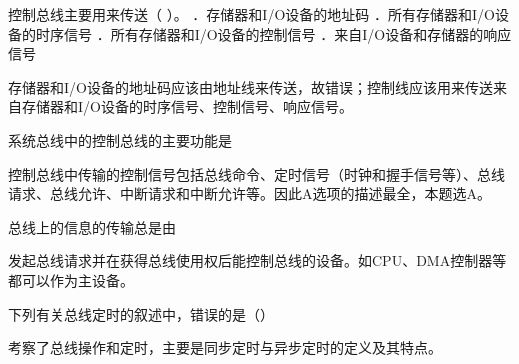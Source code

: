 \question 控制总线主要用来传送（ ）。 ．存储器和I/O设备的地址码
．所有存储器和I/O设备的时序信号 ．所有存储器和I/O设备的控制信号
．来自I/O设备和存储器的响应信号
\par{}
\begin{solution}存储器和I/O设备的地址码应该由地址线来传送，故错误；控制线应该用来传送来自存储器和I/O设备的时序信号、控制信号、响应信号。
\end{solution}
\question 系统总线中的控制总线的主要功能是
\par{}
\begin{solution}控制总线中传输的控制信号包括总线命令、定时信号（时钟和握手信号等）、总线请求、总线允许、中断请求和中断允许等。因此A选项的描述最全，本题选A。
\end{solution}
\question 总线上的信息的传输总是由
\par{}
\begin{solution}发起总线请求并在获得总线使用权后能控制总线的设备。如CPU、DMA控制器等都可以作为主设备。
\end{solution}
\question 下列有关总线定时的叙述中，错误的是（）
\par{}
\begin{solution}考察了总线操作和定时，主要是同步定时与异步定时的定义及其特点。
\end{solution}
